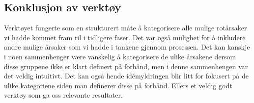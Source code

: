 \subsection{Konklusjon av verktøy}
Verktøyet fungerte som en strukturert måte å kategorisere alle mulige rotårsaker vi hadde kommet fram til i tidligere faser. Det var også mulighet for å inkludere andre mulige årsaker som vi hadde i tankene gjennom prosessen. Det kan kanskje i noen sammenhenger være vanskelig å kategorisere de ulike årsakene dersom disse gruppene ikke er klart definert på forhånd, men i denne sammenhengen var det veldig intuitivt. Det kan også hende idémyldringen blir litt for fokusert på de ulike kategoriene siden man definerer disse på forhånd. Ellers et veldig godt verktøy som ga oss relevante resultater. 
